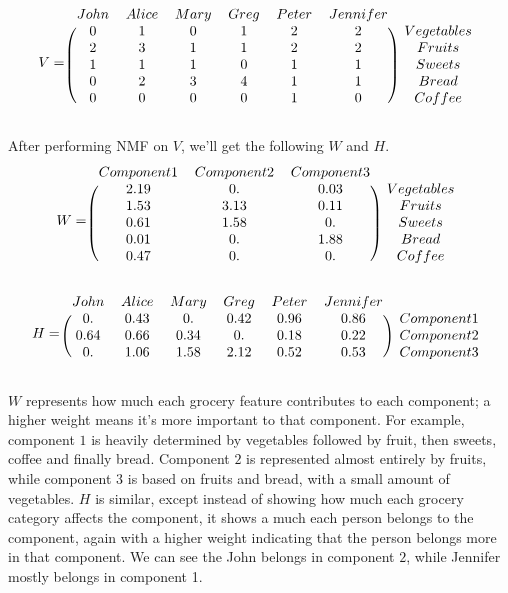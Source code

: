 \[
V =
\begin{blockarray}{ccccccc}
  John & Alice & Mary & Greg & Peter & Jennifer \\
  \begin{block}{(cccccc)c}
     0 & 1 & 0 & 1 & 2 & 2 & Vegetables \\
     2 & 3 & 1 & 1 & 2 & 2 & Fruits \\
     1 & 1 & 1 & 0 & 1 & 1 & Sweets \\
     0 & 2 & 3 & 4 & 1 & 1 & Bread \\
     0 & 0 & 0 & 0 & 1 & 0 & Coffee \\
  \end{block}
  \end{blockarray}
\]

After performing NMF on $V$, we'll get the following $W$ and $H$.
\[
W =
\begin{blockarray}{cccc}
   Component 1 & Component 2 & Component 3\\
  \begin{block}{(ccc)c}
	2.19 & 0. & 0.03 & Vegetables\\
	1.53 & 3.13 & 0.11 & Fruits\\
    0.61 & 1.58 & 0. & Sweets\\
    0.01 & 0. & 1.88 & Bread\\
    0.47 & 0.  & 0.  & Coffee\\
   \end{block}
   \end{blockarray}
\]

\[
H =
\begin{blockarray}{ccccccc}
  John & Alice & Mary & Greg & Peter & Jennifer\\
  \begin{block}{(cccccc)c}
   0.  & 0.43 & 0. & 0.42 &  0.96   &   0.86 & Component 1\\
   0.64  & 0.66 & 0.34 & 0. &  0.18   &   0.22 & Component 2\\
   0.  & 1.06 & 1.58 & 2.12 &  0.52   &   0.53 & Component 3\\
   \end{block}
   \end{blockarray}
\]

$W$ represents how much each grocery feature contributes to each component; a higher weight means it's more important to that component.
For example, component $1$ is heavily determined by vegetables followed by fruit, then sweets, coffee and finally bread.
Component $2$ is represented almost entirely by fruits, while component $3$ is based on fruits and bread, with a small amount of vegetables.
$H$ is similar, except instead of showing how much each grocery category affects the component, it shows a much each person belongs to the component, again with a higher weight indicating that the person belongs more in that component.
We can see the John belongs in component $2$, while Jennifer mostly belongs in component 1.

